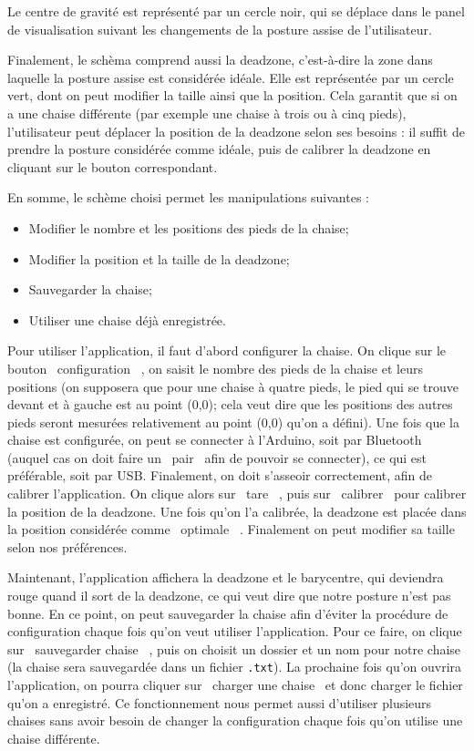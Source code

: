 \documentclass{polytech/polytech}
\begin{document}
Le centre de gravité est représenté par un cercle noir, qui se déplace dans le panel de visualisation suivant les changements de la posture assise de l'utilisateur.

Finalement, le schèma comprend aussi la deadzone, c'est-à-dire la zone dans laquelle la posture assise est considérée idéale. Elle est représentée par un cercle vert, dont on peut modifier la taille ainsi que la position. Cela garantit que si on a une chaise différente (par exemple une chaise à trois ou à cinq pieds), l'utilisateur peut déplacer la position de la deadzone selon ses besoins : il suffit de prendre la posture considérée comme idéale, puis de calibrer la deadzone en cliquant sur le bouton correspondant.

En somme, le schème choisi permet les manipulations suivantes :
\begin{itemize}
\item Modifier le nombre et les positions des pieds de la chaise;
\item Modifier la position et la taille de la deadzone;
\item Sauvegarder la chaise;
\item Utiliser une chaise déjà enregistrée.
\end{itemize}


Pour utiliser l'application, il faut d'abord configurer la chaise. On clique sur le bouton \guillemotleft\ configuration \guillemotright\ , on saisit le nombre des pieds de la chaise et leurs positions (on supposera que pour une chaise à quatre pieds, le pied qui se trouve devant et à gauche est au point (0,0); cela veut dire que les positions des autres pieds seront mesurées relativement au point (0,0) qu'on a défini). Une fois que la chaise est configurée, on peut se connecter à l'Arduino, soit par Bluetooth (auquel cas on doit faire un \guillemotleft\ pair \guillemotright\  afin de pouvoir se connecter), ce qui est préférable, soit par USB. Finalement, on doit s'asseoir correctement, afin de calibrer l'application. On clique alors sur \guillemotleft\ tare \guillemotright\ , puis sur \guillemotleft\ calibrer \guillemotright\  pour calibrer la position de la deadzone. Une fois qu'on l'a calibrée, la deadzone est placée dans la position considérée comme \guillemotleft\ optimale \guillemotright\ . Finalement on peut modifier sa taille selon nos préférences. 

Maintenant, l'application affichera la deadzone et le barycentre, qui deviendra rouge quand il sort de la deadzone, ce qui veut dire que notre posture n'est pas bonne. En ce point, on peut sauvegarder la chaise afin d'éviter la procédure de configuration chaque fois qu'on veut utiliser l'application. Pour ce faire, on clique sur \guillemotleft\ sauvegarder chaise \guillemotright\ , puis on choisit un dossier et un nom pour notre chaise (la chaise sera sauvegardée dans un fichier \texttt{.txt}). La prochaine fois qu'on ouvrira l'application, on pourra cliquer sur \guillemotleft\ charger une chaise \guillemotright\  et donc charger le fichier qu'on a enregistré. Ce fonctionnement nous permet aussi d'utiliser plusieurs chaises sans avoir besoin de changer la configuration chaque fois qu'on utilise une chaise différente.
\end{document}
